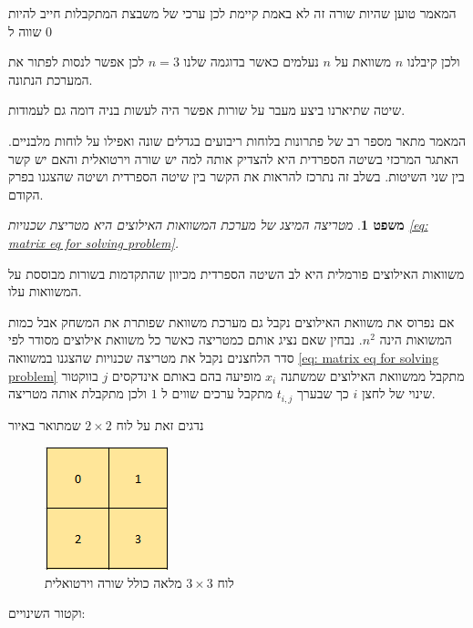 \documentclass[12pt,leqno]{article}
\newtheorem{theorem}{משפט}[section]
\begin{document}
המאמר טוען שהיות שורה זה לא באמת קיימת לכן
ערכי 
של משבצת המתקבלות 
חייב להיות שווה 
ל
$0$

ולכן קיבלנו 
$n$
משוואת על 
$n$
נעלמים 
כאשר בדוגמה שלנו 
$n=3$
לכן אפשר לנסות לפתור את המערכת הנתונה.

שיטה שתיארנו ביצע מעבר על שורות אפשר היה לעשות בניה דומה גם לעמודות.

המאמר 
\cite{B1}
מתאר מספר רב של פתרונות  בלוחות ריבועים בגדלים שונה ואפילו על לוחות מלבניים.
האתגר המרכזי בשיטה הספרדית היא להצדיק אותה למה יש שורה וירטואלית
והאם יש קשר בין שני השיטות.
בשלב זה נתרכז להראות את הקשר בין שיטה הספרדית ושיטה שהצגנו בפרק הקודם.

\begin{theorem}
    מטריצה המיצג של מערכת המשוואות האילוצים היא מטריצת שכנויות
    \ref{eq: matrix eq for solving problem}.
\end{theorem}
משוואות האילוצים פורמלית היא לב השיטה הספרדית
מכיוון שהתקדמות בשורות מבוססת על המשוואות עלו.

אם נפרוס את משוואת האילוצים נקבל גם מערכת משוואת שפותרת את המשחק
אבל כמות המשואות הינה 
$n^2$.
נבחין שאם נציג אותם כמטריצה כאשר כל משוואת אילוצים מסודר לפי סדר הלחצנים נקבל את מטריצה שכנויות שהצגנו במשוואה 
\ref{eq: matrix eq for solving problem}
מתקבל ממשוואת האילוצים שמשתנה 
$x_i$
מופיעה בהם
באותם אינדקסים 
$j$
בווקטור שינוי
של לחצן 
$i$
כך שבערך 
$t_{i,j}$
מתקבל ערכים 
שווים
ל
$1$
ולכן מתקבלת אותה מטריצה.

נדגים זאת על לוח 
$2 \times 2$
שמתואר באיור 

\begin{figure}[ht]
    \caption{לוח 
    $3 \times 3$
    מלאה
    כולל שורה וירטואלית
    }
    \label{fig: 2 x 2 board}
    \centering
    \includegraphics[width=.3\textwidth,height=.3\textheight,keepaspectratio]{images/2x2_board.PNG}
\end{figure}

וקטור השינויים:
\end{document}
